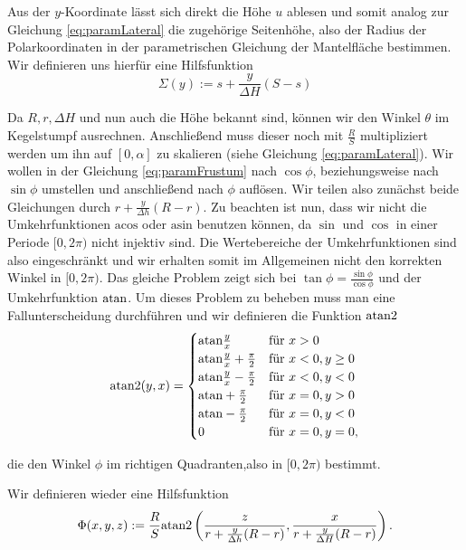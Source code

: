 Aus der $y$-Koordinate lässt sich direkt die Höhe $u$ ablesen und somit analog zur Gleichung \ref{eq:paramLateral} die zugehörige Seitenhöhe, also der Radius der Polarkoordinaten in der parametrischen Gleichung  der Mantelfläche bestimmen.  Wir definieren uns hierfür eine Hilfsfunktion 
\begin{equation} \label{eq:help1}
	\Sigma(y) := s + \frac{y}{\Delta H} (S-s)
\end{equation}


Da $R, r, \Delta H$  und nun auch die Höhe bekannt sind, können wir den Winkel $\theta$ im Kegelstumpf ausrechnen. Anschließend muss dieser noch mit  $\frac{R}{S}$ multipliziert werden um ihn auf $[0, \alpha]$ zu skalieren (siehe Gleichung \ref{eq:paramLateral}).  Wir wollen in der Gleichung \ref{eq:paramFrustum} nach $\cos\phi$, beziehungsweise nach $\sin\phi$ umstellen und anschließend nach $\phi$ auflösen. Wir teilen also zunächst beide Gleichungen durch $r + \frac{y}{\Delta h} (R - r)$. Zu beachten ist nun, dass wir nicht die Umkehrfunktionen $\text{acos}$ oder $\text{asin}$ benutzen können, da $\sin$ und $\cos$ in einer Periode $[0, 2\pi)$ nicht injektiv sind. Die Wertebereiche der Umkehrfunktionen sind also eingeschränkt und wir erhalten somit im Allgemeinen nicht den korrekten Winkel in $[0, 2\pi)$. Das gleiche Problem zeigt sich bei $\tan\phi = \frac{\sin\phi}{\cos\phi}$ und der Umkehrfunktion $\text{atan}$. Um dieses Problem zu beheben muss man eine Fallunterscheidung durchführen und wir definieren die Funktion $\text{atan2}$
\[
\text{atan2}(y,x) = 	\begin{cases}
					\text{atan} \frac{y}{x} 					& \mbox{für } x > 0 \\ 
					\text{atan} \frac{y}{x} + \frac{\pi}{2}	& \mbox{für } x < 0, y \geq 0 \\
					\text{atan} \frac{y}{x} - \frac{\pi}{2}	& \mbox{für } x < 0, y < 0 \\
					\text{atan} +\frac{\pi}{2}				& \mbox{für } x = 0, y > 0 \\
					\text{atan} -\frac{\pi}{2}				& \mbox{für } x = 0, y < 0 \\
					0									& \mbox{für } x = 0, y = 0,
				\end{cases}
\]

die den Winkel $\phi$ im richtigen Quadranten,also in $[0, 2\pi)$ bestimmt.

Wir definieren wieder eine Hilfsfunktion
\begin{equation} \label{eq:help2}
\Phi(x,y,z) := \frac{R}{S} \text{atan2}\left(\frac{z}{r + \frac{y}{\Delta h} (R - r)}, \frac{x}{r + \frac{y}{\Delta H} (R - r)}\right).
\end{equation}

